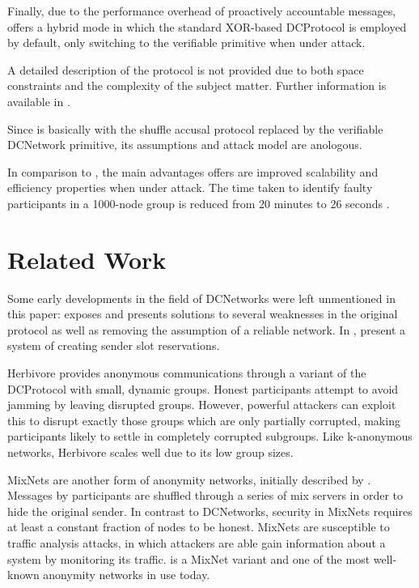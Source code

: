 Finally, due to the performance overhead of proactively accountable messages,
\Verdict offers a hybrid mode in which the standard XOR-based \ac{DCProtocol}
is employed by default, only switching to the verifiable primitive when under attack.

A detailed description of the protocol is not provided due to both space constraints and
the complexity of the subject matter. Further information is available in \cite{corrigan2013proactively}.

Since \Verdict is basically \Dissent with the shuffle accusal protocol replaced by
the verifiable \ac{DCNetwork} primitive, its assumptions and attack model are anologous.

In comparison to \Dissent, the main advantages \Verdict offers are 
improved scalability and efficiency properties when under attack. The time taken to
identify faulty participants in a 1000-node group is reduced from 20 minutes to 26 seconds \cite{corrigan2013proactively}.


\section{Related Work}

Some early developments in the field of \acp{DCNetwork} were left unmentioned in this paper:
\cite{waidner1989dining} exposes and presents solutions to several weaknesses in the
original protocol as well as removing the assumption
of a reliable network. In \cite{bos1990detection}, \citeauthor{bos1990detection} present a system of creating sender slot reservations.

Herbivore \cite{goel2003herbivore} provides anonymous communications through a variant of the
\ac{DCProtocol} with small, dynamic groups. Honest participants attempt to avoid jamming by
leaving disrupted groups. However, powerful attackers can exploit this to disrupt exactly those groups
which are only partially corrupted, making participants likely to settle in completely corrupted subgroups.
Like k-anonymous networks, Herbivore scales well due to its low group sizes.

\acp{MixNet} are another form of anonymity networks, initially described by \citeauthor{journals/cacm/Chaum81}
\cite{journals/cacm/Chaum81}. Messages by participants are shuffled through a series of mix servers
in order to hide the original sender. In contrast to \acp{DCNetwork}, security in \acp{MixNet} requires
at least a constant fraction of nodes to be honest. \acp{MixNet} are susceptible to traffic analysis attacks,
in which attackers are able gain information about a system by monitoring its traffic.
\Tor \cite{conf/uss/DingledineMS04} is a \ac{MixNet} variant and one of the most well-known anonymity networks
in use today.

